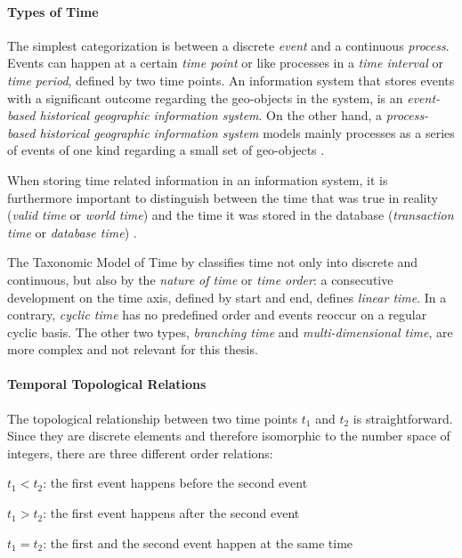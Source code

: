 \paragraph{Types of Time} %
\label{par:types_of_time}

The simplest categorization is between a discrete \emph{event} and a continuous \emph{process}. Events can happen at a certain \emph{time point} or like processes in a \emph{time interval} or \emph{time period}, defined by two time points. An information system that stores events with a significant outcome regarding the geo-objects in the system, is an \emph{event-based historical geographic information system}. On the other hand, a \emph{process-based historical geographic information system} models mainly processes as a series of events of one kind regarding a small set of geo-objects
\cite[chapter 2, pp. 47-49]{solana2014spatio}.

When storing time related information in an information system, it is furthermore important to distinguish between the time that was true in reality (\emph{valid time} or \emph{world time}) and the time it was stored in the database (\emph{transaction time} or \emph{database time})
\cite[p. 69]{ott2001time}.

The Taxonomic Model of Time by
\cite{frank98typesoftime}
classifies time not only into discrete and continuous, but also by the \emph{nature of time} or \emph{time order}: a consecutive development on the time axis, defined by start and end, defines \emph{linear time}. In a contrary, \emph{cyclic time} has no predefined order and events reoccur on a regular cyclic basis. The other two types, \emph{branching time} and \emph{multi-dimensional time}, are more complex and not relevant for this thesis.


\paragraph{Temporal Topological Relations} %
\label{par:temporal_relations}

The topological relationship between two time points $t_1$ and $t_2$ is straightforward. Since they are discrete elements and therefore isomorphic to the number space of integers, there are three different order relations:
\begin{compactenum}
  \item $t_1 < t_2$: the first event happens before the second event
  \item $t_1 > t_2$: the first event happens after the second event
  \item $t_1 = t_2$: the first and the second event happen at the same time
\end{compactenum}

